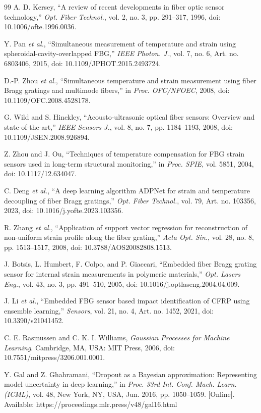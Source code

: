 \documentclass[journal,twoside,web]{ieeecolor}
\begin{document}
\begin{thebibliography}{99}
A. D. Kersey,
``A review of recent developments in fiber optic sensor technology,''
\emph{Opt. Fiber Technol.}, vol. 2, no. 3, pp. 291--317, 1996,
doi: 10.1006/ofte.1996.0036.

Y. Pan \emph{et al.},
``Simultaneous measurement of temperature and strain using spheroidal-cavity-overlapped FBG,''
\emph{IEEE Photon. J.}, vol. 7, no. 6, Art. no. 6803406, 2015,
doi: 10.1109/JPHOT.2015.2493724.

D.-P. Zhou \emph{et al.},
``Simultaneous temperature and strain measurement using fiber Bragg gratings and multimode fibers,''
in \emph{Proc. OFC/NFOEC}, 2008,
doi: 10.1109/OFC.2008.4528178.

G. Wild and S. Hinckley,
``Acousto-ultrasonic optical fiber sensors: Overview and state-of-the-art,''
\emph{IEEE Sensors J.}, vol. 8, no. 7, pp. 1184--1193, 2008,
doi: 10.1109/JSEN.2008.926894.

Z. Zhou and J. Ou,
``Techniques of temperature compensation for FBG strain sensors used in long-term structural monitoring,''
in \emph{Proc. SPIE}, vol. 5851, 2004,
doi: 10.1117/12.634047.

C. Deng \emph{et al.},
``A deep learning algorithm ADPNet for strain and temperature decoupling of fiber Bragg gratings,''
\emph{Opt. Fiber Technol.}, vol. 79, Art. no. 103356, 2023,
doi: 10.1016/j.yofte.2023.103356.

R. Zhang \emph{et al.},
``Application of support vector regression for reconstruction of non-uniform strain profile along the fiber grating,''
\emph{Acta Opt. Sin.}, vol. 28, no. 8, pp. 1513--1517, 2008,
doi: 10.3788/AOS20082808.1513.

J. Botsis, L. Humbert, F. Colpo, and P. Giaccari, ``Embedded fiber Bragg grating sensor for internal strain measurements in polymeric materials,'' \emph{Opt. Lasers Eng.}, vol. 43, no. 3, pp. 491--510, 2005, doi: 10.1016/j.optlaseng.2004.04.009.

J. Li \emph{et al.}, ``Embedded FBG sensor based impact identification of CFRP using ensemble learning,'' \emph{Sensors}, vol. 21, no. 4, Art. no. 1452, 2021, doi: 10.3390/s21041452.

C. E. Rasmussen and C. K. I. Williams, \emph{Gaussian Processes for Machine Learning}. Cambridge, MA, USA: MIT Press, 2006, doi: 10.7551/mitpress/3206.001.0001.

Y. Gal and Z. Ghahramani, ``Dropout as a Bayesian approximation: Representing model uncertainty in deep learning,'' in \emph{Proc. 33rd Int. Conf. Mach. Learn. (ICML)}, vol. 48, New York, NY, USA, Jun. 2016, pp. 1050--1059. [Online]. Available: https://proceedings.mlr.press/v48/gal16.html


\end{thebibliography}
\end{document}
